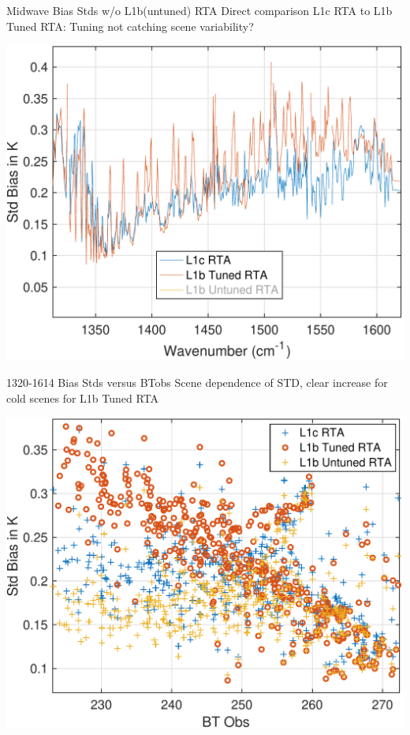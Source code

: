 \documentclass[10pt,t]{beamer}
\begin{document}
\begin{frame}[label={sec:org916b712}]{Midwave Bias Stds w/o L1b(untuned) RTA}
Direct comparison L1c RTA to L1b Tuned RTA: Tuning not catching scene variability?
\begin{center}
\includegraphics[width=0.75\linewidth]{./std_3rta_mw_nol1b untuned.pdf}
\end{center}
\end{frame}
\begin{frame}[label={sec:org8aa77db}]{1320-1614 \wn Bias Stds versus BTobs}
Scene dependence of STD, clear increase for cold scenes for L1b Tuned RTA
\begin{center}
\includegraphics[width=0.75\linewidth]{./std_vs_btobs_1320-1614.pdf}
\end{center}
\end{frame}
\end{document}

